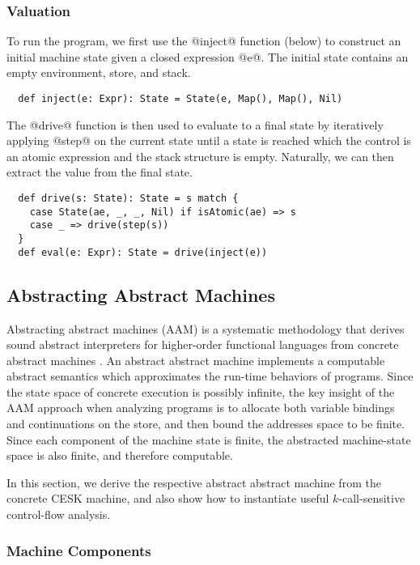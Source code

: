 \documentclass[acmsmall, screen]{acmart}\settopmatter{}
\begin{document}
\subsubsection{Valuation}\label{sec:drive}

To run the program, we first use the @inject@ function (below) to construct an initial
machine state given a closed expression @e@. The initial state contains an empty environment,
store, and stack.
\begin{lstlisting}
  def inject(e: Expr): State = State(e, Map(), Map(), Nil)
\end{lstlisting}

The @drive@ function is then used to evaluate to a final state by iteratively applying
@step@ on the current state until a state is reached which the control is an atomic
expression and the stack structure is empty. Naturally, we can then extract the value
from the final state.

\begin{lstlisting}
  def drive(s: State): State = s match {
    case State(ae, _, _, Nil) if isAtomic(ae) => s
    case _ => drive(step(s))
  }
  def eval(e: Expr): State = drive(inject(e))
\end{lstlisting}

\subsection{Abstracting Abstract Machines} \label{aam}
Abstracting abstract machines (AAM) is a systematic methodology that derives sound
abstract interpreters for higher-order functional languages from concrete abstract
machines \cite{van2012systematic, van2010abstracting}. An abstract abstract machine
implements a computable abstract semantics which approximates the run-time behaviors of
programs.
Since the state space of concrete execution is possibly infinite, the key insight of the
AAM approach when analyzing programs is to allocate both variable bindings and continuations
on the store, and then bound the addresses space to be finite. Since each component
of the machine state is finite, the abstracted machine-state space is also finite,
and therefore computable.

In this section, we derive the respective abstract abstract machine from the concrete
CESK machine, and also show how to instantiate useful $k$-call-sensitive
control-flow analysis.

\subsubsection{Machine Components}
\end{document}

